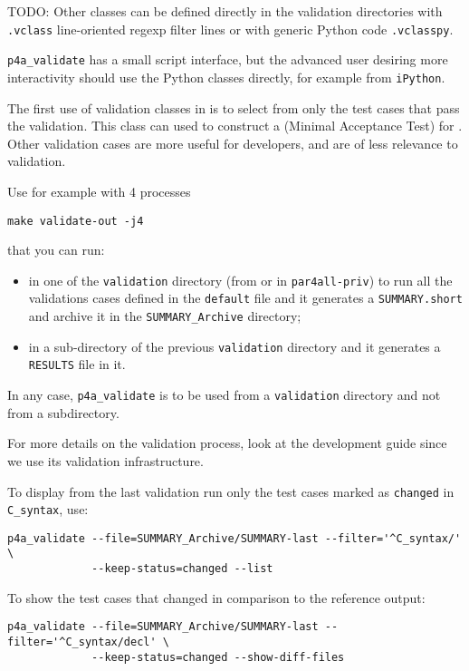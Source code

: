 \documentclass[a4paper]{article}
\begin{document}
TODO: Other classes can be defined directly in the validation
directories with \texttt{.vclass} line-oriented regexp filter lines or with
generic Python code \texttt{.vclasspy}.

\verb|p4a_validate| has a small script interface, but the advanced
user desiring more interactivity
should use the Python classes directly, for example from \texttt{iPython}.

The first use of validation classes in \Apfa is to select from \Apips
only the test cases that pass the \Apips validation. This class can used to
construct a
\Amat (Minimal Acceptance Test) for \Apfa. Other \Apips validation
cases are more useful for \Apips developers, and are of less relevance
to \Apfa validation.

\label{sec:example}

Use for example with 4 processes
\begin{verbatim}
make validate-out -j4
\end{verbatim}
that you can run:
\begin{itemize}
\item in one of the \texttt{validation} directory (from \Apips or in
  \texttt{par4all-priv}) to run all the validations cases defined in the
  \texttt{default} file and it generates a \texttt{SUMMARY.short} and
  archive it in the \verb|SUMMARY_Archive| directory;
\item in a sub-directory of the previous \texttt{validation} directory and
  it generates a \texttt{RESULTS} file in it.
\end{itemize}
In any case, \verb|p4a_validate| is to be used from a \texttt{validation}
directory and not from a subdirectory.

For more details on the validation process, look at the \Apips development
guide since we use its validation infrastructure.

To display from the last validation run only the test cases marked as
\texttt{changed} in \verb|C_syntax|, use:
\begin{verbatim}
p4a_validate --file=SUMMARY_Archive/SUMMARY-last --filter='^C_syntax/' \
             --keep-status=changed --list
\end{verbatim}

To show the test cases that changed in comparison to the reference output:
\begin{verbatim}
p4a_validate --file=SUMMARY_Archive/SUMMARY-last --filter='^C_syntax/decl' \
             --keep-status=changed --show-diff-files
\end{verbatim}
\end{document}
